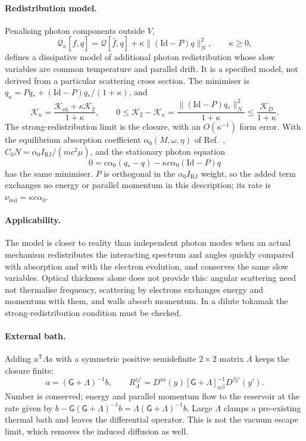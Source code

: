 \documentclass[11pt,a4paper]{article}
\numberwithin{equation}{section}
\newcommand{\fh}{\hat f}
\newcommand{\Kex}{\mathcal K_{\mathrm{ex}}}
\begin{document}
\paragraph{Redistribution model.} Penalising photon components outside $V$,
\begin{equation}
\mathcal Q_\kappa[\fh,q]=\mathcal Q[\fh,q]+\kappa\|(\mathrm{Id}-P)q\|_N^2,\qquad\kappa\ge0,
\end{equation}
defines a dissipative model of additional photon redistribution whose slow
variables are common temperature and parallel drift. It is a specified model,
not derived from a particular scattering cross section. The minimiser is
$q_\kappa=Pq_*+(\mathrm{Id}-P)q_*/(1+\kappa)$, and
\begin{equation}
\boxed{\mathcal K_\kappa=\frac{\Kex+\kappa\mathcal K_2}{1+\kappa},\qquad
0\le\mathcal K_2-\mathcal K_\kappa=\frac{\|(\mathrm{Id}-P)q_*\|_N^2}{1+\kappa}\le\frac{\mathcal K_D}{1+\kappa}.}
\end{equation}
The strong-redistribution limit is the closure, with an $O(\kappa^{-1})$ form
error. With the equilibrium absorption coefficient $\alpha_0(M,\omega,\eta)$ of
Ref.~\cite{KK96}, $C_0N=\alpha_0I_{\mathrm{RJ}}/(mc^2\mu)$, and the stationary
photon equation
\begin{equation}
0=c\alpha_0(q_*-q)-\kappa c\alpha_0(\mathrm{Id}-P)q
\end{equation}
has the same minimiser. $P$ is orthogonal in the $\alpha_0I_{\mathrm{RJ}}$ weight, so
the added term exchanges no energy or parallel momentum in this description;
its rate is $\nu_{\mathrm{red}}=\kappa c\alpha_0$.

\paragraph{Applicability.} The model is closer to reality than independent
photon modes when an actual mechanism redistributes the interacting spectrum
and angles quickly compared with absorption and with the electron evolution,
and conserves the same slow variables. Optical thickness alone does not
provide this: angular scattering need not thermalise frequency, scattering by
electrons exchanges energy and momentum with them, and walls absorb momentum.
In a dilute tokamak the strong-redistribution condition must be checked.

\paragraph{External bath.} Adding $a^{\mathsf T}\Lambda a$ with a symmetric positive
semidefinite $2\times2$ matrix $\Lambda$ keeps the closure finite:
\begin{equation}
a=(\mathsf G+\Lambda)^{-1}b,\qquad R_\Lambda^{ij'}=D^{i\alpha}(y)[\mathsf G+\Lambda]^{-1}_{\alpha\beta}D^{\beta j'}(y').
\end{equation}
Number is conserved; energy and parallel momentum flow to the reservoir at
the rate given by $b-\mathsf G(\mathsf G+\Lambda)^{-1}b=\Lambda(\mathsf G+\Lambda)^{-1}b$.
Large $\Lambda$ clamps a pre-existing thermal bath and leaves the differential
operator. This is not the vacuum escape limit, which removes the induced
diffusion as well.
\end{document}
